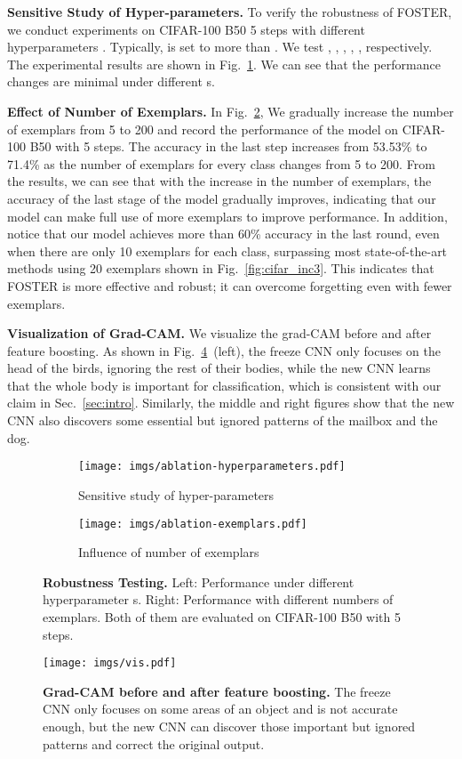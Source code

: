 \documentclass[runningheads]{llncs}
\begin{document}
\noindent\textbf{Sensitive Study of Hyper-parameters.}
To verify the robustness of FOSTER, we conduct experiments on CIFAR-100 B50 5 steps with different hyperparameters . Typically,  is set to more than . We test , , , , ,  respectively. The experimental results are shown in Fig.~\ref{fig:beta}.  We can see that the performance changes are minimal under different s.

\noindent\textbf{Effect of Number of Exemplars.}
In Fig.~\ref{fig:exemplar}, We gradually increase the number of exemplars from 5 to 200 and record the performance of the model on CIFAR-100 B50 with 5 steps. The accuracy in the last step increases from 53.53\% to 71.4\% as the number of exemplars for every class changes from 5 to 200. From the results, we can see that with the increase in the number of exemplars, the accuracy of the last stage of the model gradually improves, indicating that our model can make full use of more exemplars to improve performance. 
In addition, notice that our model achieves more than 60\% accuracy in the last round, even when there are only 10 exemplars for each class, surpassing most state-of-the-art methods using 20 exemplars shown in Fig.~\ref{fig:cifar_inc3}. This indicates that FOSTER is more effective and robust; it can overcome forgetting even with fewer exemplars. 

\noindent\textbf{Visualization of Grad-CAM.} We visualize the grad-CAM before and after feature boosting. As shown in Fig.~\ref{fig:gradcam}~(left), the freeze CNN only focuses on the head of the birds, ignoring the rest of their bodies, while the new CNN learns that the whole body is important for classification, which is consistent with our claim in Sec.~\ref{sec:intro}. Similarly, the middle and right figures show that the new CNN also discovers some essential but ignored patterns of the mailbox and the dog.

\begin{figure}[t]
    \centering
    \begin{subfigure}[b]{0.46\linewidth}
    \texttt{[image: imgs/ablation-hyperparameters.pdf]}
    \caption{\small Sensitive study of hyper-parameters}
    \label{fig:beta}
  \end{subfigure}
  \hfill
   \begin{subfigure}[b]{0.46\linewidth}
    \texttt{[image: imgs/ablation-exemplars.pdf]}
    \caption{\small Influence of number of exemplars }
    \label{fig:exemplar}
  \end{subfigure}
    \caption{\small  \textbf{Robustness Testing.} Left: Performance under different hyperparameter s. Right: Performance with different numbers of exemplars. Both of them are evaluated on CIFAR-100 B50 with 5 steps.}
    \label{fig:RT}
\end{figure}
\begin{figure}[t]
    \centering
    \texttt{[image: imgs/vis.pdf]}
    \caption{\small \textbf{Grad-CAM before and after feature boosting.} The freeze CNN only focuses on some areas of an object and is not accurate enough, but the new CNN can discover those important but ignored patterns and correct the original output.}
    \label{fig:gradcam}
\end{figure}
\end{document}
